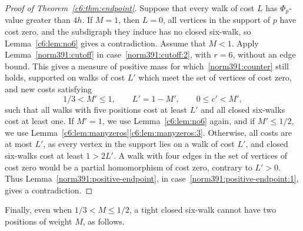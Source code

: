 \begin{proof}[Proof of Theorem~\ref{c6:thm:endpoint}]
Suppose that every walk of cost $L$ has $\Phi_p$-value greater than $4h$.
If $M=1$, then $L=0$, all vertices in the support of $p$ have cost zero, and the subdigraph they induce has no closed six-walk, so Lemma~\ref{c6:lem:no6} gives a contradiction. Assume that $M<1$.
Apply Lemma~\ref{norm391:cutoff} in case~\ref{norm391:cutoff:2}, with $r=6$, without an edge bound. This gives a measure of positive mass for which~\eqref{norm391:counter} still holds, supported on walks of cost $L'$ which meet the set of vertices of cost zero, and new costs satisfying
\[
 1/3<M'\le1,\qquad L'=1-M',\qquad 0\le c'<M',
\]
such that all walks with five positions cost at least $L'$ and all closed six-walks cost at least one.
If $M'=1$, we use Lemma~\ref{c6:lem:no6} again, and if $M'\le1/2$, we use Lemma~\ref{c6:lem:manyzeros}\ref{c6:lem:manyzeros:3}.
Otherwise, all costs are at most $L'$, as every vertex in the support lies on a walk of cost $L'$, and closed six-walks cost at least $1>2L'$. A walk with four edges in the set of vertices of cost zero would be a partial homomorphism of cost zero, contrary to $L'>0$. Thus Lemma~\ref{norm391:positive-endpoint}, in case~\ref{norm391:positive-endpoint:1}, gives a contradiction.
\end{proof}

Finally, even when $1/3<M\le1/2$, a tight closed six-walk cannot have two positions of weight $M$, as follows.

